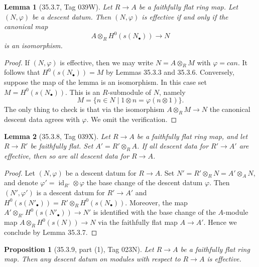 \documentclass[UTF8,11pt]{ctexart}
\newtheorem*{lemma}{Lemma}
\newtheorem*{proposition}{Proposition}
\theoremstyle{definition}
\DeclareMathOperator{\id}{id}
\begin{document}
\begin{lemma}[35.3.7, Tag 039W]
Let $R\to A$ be a faithfully flat ring map. Let $(N,\varphi)$ be a descent datum. Then $(N,\varphi)$ is effective if and only if the canonical map
\[
A\otimes_R H^0(s(N_\bullet))\longrightarrow N
\]
is an isomorphism.
\end{lemma}
\begin{proof}
If $(N,\varphi)$ is effective, then we may write $N=A\otimes_R M$ with $\varphi=can$. It follows that $H^0(s(N_\bullet))=M$ by Lemmas 35.3.3 and 35.3.6. Conversely, suppose the map of the lemma is an isomorphism. In this case set $M=H^0(s(N_\bullet))$. This is an $R$-submodule of $N$, namely
\[
M=\{n\in N\mid1\otimes n=\varphi(n\otimes1)\}.
\]
The only thing to check is that via the isomorphism $A\otimes_R M\to N$ the canonical descent data agrees with $\varphi$. We omit the verification.
\end{proof}
\begin{lemma}[35.3.8, Tag 039X]
Let $R\to A$ be a faithfully flat ring map, and let $R\to R'$ be faithfully flat. Set $A'=R'\otimes_R A$. If all descent data for $R'\to A'$ are effective, then so are all descent data for $R\to A$.
\end{lemma}
\begin{proof}
Let $(N,\varphi)$ be a descent datum for $R\to A$. Set $N'=R'\otimes_R N=A'\otimes_A N$, and denote $\varphi'=\id_{R'}\otimes\varphi$ the base change of the descent datum $\varphi$. Then $(N',\varphi')$ is a descent datum for $R'\to A'$ and $H^0(s(N'_\bullet))=R'\otimes_R H^0(s(N_\bullet))$. Moreover, the map $A'\otimes_{R'}H^0(s(N'_\bullet))\to N'$ is identified with the base change of the $A$-module map $A\otimes_R H^0(s(N))\to N$ via the faithfully flat map $A\to A'$. Hence we conclude by Lemma 35.3.7.
\end{proof}
\begin{proposition}[35.3.9, part (1), Tag 023N]
Let $R\to A$ be a faithfully flat ring map. Then any descent datum on modules with respect to $R\to A$ is effective.
\end{proposition}
\end{document}
